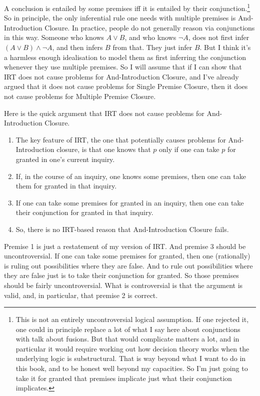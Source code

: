 \documentclass[11pt,]{book}
\providecommand{\tightlist}{%
  \setlength{\itemsep}{0pt}\setlength{\parskip}{0pt}}
\let\rmarkdownfootnote\footnote%
\def\footnote{\protect\rmarkdownfootnote}
\begin{document}
A conclusion is entailed by some premises iff it is entailed by their conjunction.\footnote{This is not an entirely uncontroversial logical assumption. If one rejected it, one could in principle replace a lot of what I say here about conjunctions with talk about fusions. But that would complicate matters a lot, and in particular it would require working out how decision theory works when the underlying logic is substructural. That is way beyond what I want to do in this book, and to be honest well beyond my capacities. So I'm just going to take it for granted that premises implicate just what their conjunction implicates.} So in principle, the only inferential rule one needs with multiple premises is And-Introduction Closure. In practice, people do not generally reason via conjunctions in this way. Someone who knows \(A \vee B\), and who knows \(\neg A\), does not first infer \((A \vee B) \wedge \neg A\), and then infers \(B\) from that. They just infer \(B\). But I think it's a harmless enough idealisation to model them as first inferring the conjunction whenever they use multiple premises. So I will assume that if I can show that IRT does not cause problems for And-Introduction Closure, and I've already argued that it does not cause problems for Single Premise Closure, then it does not cause problems for Multiple Premise Closure.

Here is the quick argument that IRT does not cause problems for And-Introduction Closure.

\begin{enumerate}
\def\labelenumi{\arabic{enumi}.}
\tightlist
\item
  The key feature of IRT, the one that potentially causes problems for And-Introduction closure, is that one knows that \(p\) only if one can take \(p\) for granted in one's current inquiry.
\item
  If, in the course of an inquiry, one knows some premises, then one can take them for granted in that inquiry.
\item
  If one can take some premises for granted in an inquiry, then one can take their conjunction for granted in that inquiry.
\item
  So, there is no IRT-based reason that And-Introduction Closure fails.
\end{enumerate}

Premise 1 is just a restatement of my version of IRT. And premise 3 should be uncontroversial. If one can take some premises for granted, then one (rationally) is ruling out possibilities where they are false. And to rule out possibilities where they are false just is to take their conjunction for granted. So those premises should be fairly uncontroversial. What is controversial is that the argument is valid, and, in particular, that premise 2 is correct.
\end{document}
